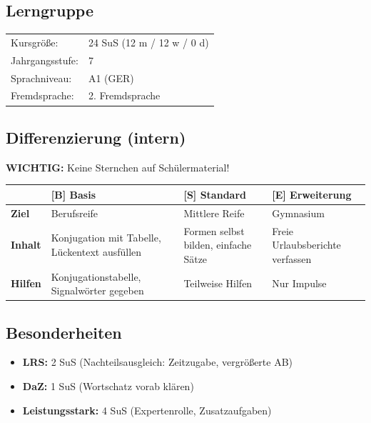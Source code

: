 \documentclass[11pt,a4paper]{article}
\newcommand{\jahrgangsstufe}{7}
\newcommand{\lerngruppengroesse}{24}
\newcommand{\maennlich}{12}
\newcommand{\weiblich}{12}
\newcommand{\divers}{0}
\newcommand{\gerniveau}{A1}
\begin{document}
\subsection{Lerngruppe}
\begin{tabular}{ll}
    Kursgröße: & \lerngruppengroesse{} SuS (\maennlich{} m / \weiblich{} w / \divers{} d) \\
    Jahrgangsstufe: & \jahrgangsstufe \\
    Sprachniveau: & \gerniveau{} (GER) \\
    Fremdsprache: & 2. Fremdsprache \\
\end{tabular}

\subsection{Differenzierung (intern)}

\textbf{WICHTIG:} Keine Sternchen auf Schülermaterial!

\begin{tabular}{|l|p{4cm}|p{4cm}|p{4cm}|}
\hline
& \textbf{[B] Basis} & \textbf{[S] Standard} & \textbf{[E] Erweiterung} \\
\hline
\textbf{Ziel} & Berufsreife & Mittlere Reife & Gymnasium \\
\hline
\textbf{Inhalt} & Konjugation mit Tabelle, Lückentext ausfüllen & Formen selbst bilden, einfache Sätze & Freie Urlaubsberichte verfassen \\
\hline
\textbf{Hilfen} & Konjugationstabelle, Signalwörter gegeben & Teilweise Hilfen & Nur Impulse \\
\hline
\end{tabular}

\subsection{Besonderheiten}
\begin{itemize}
    \item \textbf{LRS:} 2 SuS (Nachteilsausgleich: Zeitzugabe, vergrößerte AB)
    \item \textbf{DaZ:} 1 SuS (Wortschatz vorab klären)
    \item \textbf{Leistungsstark:} 4 SuS (Expertenrolle, Zusatzaufgaben)
\end{itemize}

\end{document}
